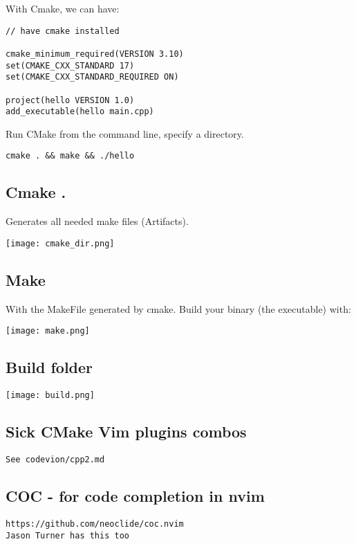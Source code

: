 \documentclass[openany]{report}
\begin{document}
With Cmake, we can have:

\begin{verbatim}
// have cmake installed

cmake_minimum_required(VERSION 3.10)
set(CMAKE_CXX_STANDARD 17)
set(CMAKE_CXX_STANDARD_REQUIRED ON)

project(hello VERSION 1.0)
add_executable(hello main.cpp)
\end{verbatim}

Run CMake from the command line, specify a directory.
\begin{verbatim}
cmake . && make && ./hello
\end{verbatim}

\subsection{Cmake .  }

Generates all needed make files (Artifacts).

\begin{center}
    \texttt{[image: cmake\_dir.png]}
\end{center}

\subsection{Make}

With the MakeFile generated by cmake. Build your binary (the executable) with:

\begin{center}
    \texttt{[image: make.png]}
\end{center}

\subsection{Build folder}

\begin{center}
    \texttt{[image: build.png]}
\end{center}

\subsection{Sick CMake Vim plugins combos}

\begin{verbatim}
See codevion/cpp2.md
\end{verbatim}

\subsection{COC - for code completion in nvim}
\begin{verbatim}
https://github.com/neoclide/coc.nvim
Jason Turner has this too
\end{verbatim}
\end{document}
